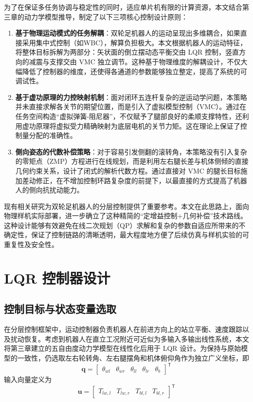 为了在保证多任务协调与稳定性的同时，适应单片机有限的计算资源，本文结合第三章的动力学模型推导，制定了以下三项核心控制设计原则：

\begin{enumerate}
  \item \textbf{基于物理运动模式的任务解耦}：双轮足机器人的运动呈现出多维耦合，如果直接采用集中式控制（如WBC），解算负担极大。本文根据机器人的运动特征，将整体目标拆解为两部分：矢状面的倒立摆动态平衡交由 LQR 控制，竖直方向的减震与支撑交由 VMC 独立调节。这种基于物理维度的解耦设计，不仅大幅降低了控制器的维度，还使得各通道的参数能够独立整定，提高了系统的可调试性。
  \item \textbf{基于虚功原理的力控映射机制}：面对闭环五连杆复杂的逆运动学问题，本策略并未直接求解各关节的期望位置，而是引入了虚拟模型控制（VMC）。通过在任务空间构造“虚拟弹簧-阻尼器”，不仅赋予了腿部良好的柔顺支撑特性，还利用虚功原理将虚拟受力精确映射为底层电机的关节力矩。这在理论上保证了控制量分配的准确性。
  \item \textbf{侧向姿态的代数补偿策略}：对于容易引发侧翻的滚转角，本策略没有引入复杂的零矩点（ZMP）方程进行在线规划，而是利用左右腿长差与机体侧倾的直接几何约束关系，设计了闭式的解析代数方程。通过直接对 VMC 的腿长目标施加差动修正，在不增加控制环路复杂度的前提下，以最直接的方式提高了机器人的侧向抗扰动能力。
\end{enumerate}

现有相关研究\cite{klemm2020lqr,yang2024integrated}为双轮足机器人的分层控制提供了重要参考。本文在此思路上，面向物理样机实际部署，进一步确立了这种精简的“定增益控制+几何补偿”技术路线。这种设计能够有效避免在线二次规划（QP）求解和复杂的参数自适应所带来的不确定性，保证了控制链路的清晰透明，最大程度地方便了后续仿真与样机实验的可重复性及安全性。

\section{LQR 控制器设计}

\subsection{控制目标与状态变量选取}

在分层控制框架中，运动控制器负责机器人在前进方向上的站立平衡、速度跟踪以及扰动恢复。考虑到机器人在直立工况附近可近似为多输入多输出线性系统，本文将第三章建立的五自由度动力学模型在线性化后用于 LQR 设计。为保持与原始模型的一致性，仍选取左右轮转角、左右腿摆角和机体俯仰角作为独立广义坐标，即
\begin{equation}
  \boldsymbol{q} =
  \begin{bmatrix}
    \theta_{wl} & \theta_{wr} & \theta_{ll} & \theta_{lr} & \theta_b
  \end{bmatrix}^{\mathsf{T}}
  \label{eq:full-generalized-coordinate}
\end{equation}
输入向量定义为
\begin{equation}
  \boldsymbol{u} =
  \begin{bmatrix}
    T_{lw,l} & T_{lw,r} & T_{bl,l} & T_{bl,r}
  \end{bmatrix}^{\mathsf{T}}
  \label{eq:full-input-vector}
\end{equation}

